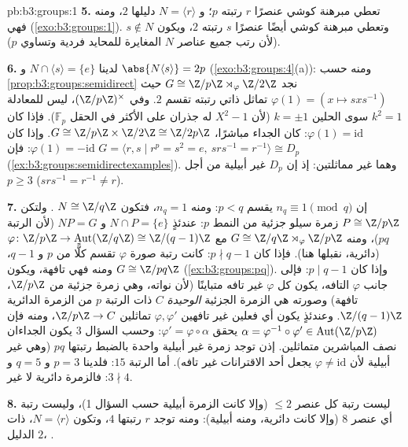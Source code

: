 \begin{solution}{pb:b3:groups:1}
\textbf{5.} تعطي مبرهنة كوشي عنصرًا $r$ رتبته $p$؛ و $N = \langle r
\rangle$
دليلها $2$، ومنه فهي  (\cref{exo:b3:groups:1}). وتعطي مبرهنة كوشي
أيضًا عنصرًا $s$ رتبته $2$، ويكون $s \notin N$ (لأن رتب جميع
عناصر $N$ المغايرة للمحايد فردية وتساوي $p$).

\textbf{6.} لدينا $N \cap \langle s \rangle = \{e\}$ و $\abs{N\langle
s\rangle} = 2p$ (\cref{exo:b3:groups:4}(a)): ومنه حسب
\cref{prop:b3:groups:semidirect} نجد $G \cong \Z/p\Z \rtimes_\varphi
\Z/2\Z$ حيث $\varphi(1) = (x \mapsto sxs^{-1})$ تماثل ذاتي رتبته تقسم $2$.
وفي $(\Z/p\Z)^\times$، ليس للمعادلة $k^2 = 1$ سوى الحلين $k = \pm 1$
(لأن $X^2 - 1$ له جذران على الأكثر في الحقل $\mathbb F_p$). فإذا
كان $\varphi(1) = \mathrm{id}$: كان الجداء مباشرًا، $G \cong \Z/p\Z \times \Z/2\Z \cong \Z/2p\Z$. وإذا كان $\varphi(1) = -\mathrm{id}$:
فإن $G = \langle r, s \mid r^p = s^2 = e,
\ srs^{-1} = r^{-1}\rangle \cong D_p$ (\cref{ex:b3:groups:semidirectexamples}). وهما غير مماثلتين: إذ إن $D_p$ غير
أبيلية من أجل $p \geq 3$ ($srs^{-1} = r^{-1} \neq r$).

\textbf{7.} إن $n_q \equiv 1 \pmod q$ يقسم $p < q$: ومنه $n_q = 1$، فتكون
$N \cong \Z/q\Z$ . ولتكن $P \cong \Z/p\Z$ زمرة سيلو جزئية
من النمط $p$: عندئذٍ $N \cap P = \{e\}$ و $NP = G$ (لأن الرتبة $pq$)، ومنه
$G
\cong \Z/q\Z \rtimes_\varphi \Z/p\Z$ مع $\varphi \colon \Z/p\Z
\to \operatorname{Aut}(\Z/q\Z) \cong \Z/(q-1)\Z$ (دائرية، نقبلها هنا). فإذا كان
$p \nmid q - 1$: كانت رتبة صورة $\varphi$ تقسم كلًّا من $p$
و $q-1$، ومنه فهي تافهة، ويكون $G \cong
\Z/pq\Z$ (\cref{ex:b3:groups:pq}). وإذا كان
$p \mid q - 1$: فإلى جانب $\varphi$ التافه، يكون كل $\varphi$
غير تافه متباينًا (لأن نواته، وهي زمرة جزئية من $\Z/p\Z$، تافهة)
وصورته هي الزمرة الجزئية \emph{الوحيدة} $C$ ذات الرتبة $p$ من الزمرة
الدائرية $\Z/(q-1)\Z$. وعندئذٍ يكون أي فعلين غير تافهين $\varphi, \varphi'$
تماثلين $\Z/p\Z \to C$، ومنه فإن $\alpha =
\varphi^{-1}\circ\varphi' \in \operatorname{Aut}(\Z/p\Z)$ يحقق $\varphi' = \varphi\circ\alpha$: وحسب
السؤال 3 يكون الجداءان نصف المباشرين متماثلين. إذن توجد زمرة
غير أبيلية واحدة بالضبط رتبتها $pq$ (وهي غير أبيلية لأن $\varphi \neq
\mathrm{id}$
يجعل أحد الاقترانات غير تافه). أما الرتبة $15$: فلدينا $p =
3$
و $q = 5$ و $3 \nmid 4$: فالزمرة دائرية لا غير.

\textbf{8.} ليست رتبة كل عنصر $\leq 2$ (وإلا كانت الزمرة أبيلية
حسب السؤال 1)، وليست رتبة أي عنصر $8$ (وإلا كانت دائرية، ومنه
أبيلية): ومنه توجد $r$ رتبتها $4$، وتكون $N = \langle r\rangle$، ذات الدليل
$2$، .


\end{solution}
